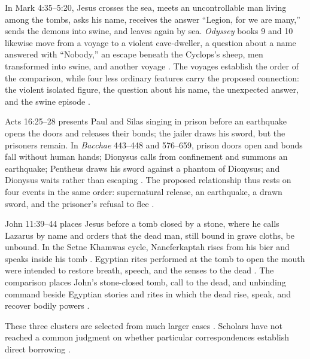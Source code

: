 In Mark 4:35--5:20, Jesus crosses the sea, meets an uncontrollable man living among the tombs, asks his name, receives the answer ``Legion, for we are many,'' sends the demons into swine, and leaves again by sea.
\emph{Odyssey} books 9 and 10 likewise move from a voyage to a violent cave-dweller, a question about a name answered with ``Nobody,'' an escape beneath the Cyclops's sheep, men transformed into swine, and another voyage \cite[9]{homer:odyssey}\cite[10]{homer:odyssey}\cite[63--74, 175--176]{macdonald:homeric-mark}.
The voyages establish the order of the comparison, while four less ordinary features carry the proposed connection: the violent isolated figure, the question about his name, the unexpected answer, and the swine episode \cite[63--74, 175--176]{macdonald:homeric-mark}.

Acts 16:25--28 presents Paul and Silas singing in prison before an earthquake opens the doors and releases their bonds; the jailer draws his sword, but the prisoners remain.
In \emph{Bacchae} 443--448 and 576--659, prison doors open and bonds fall without human hands; Dionysus calls from confinement and summons an earthquake; Pentheus draws his sword against a phantom of Dionysus; and Dionysus waits rather than escaping \cite[443--448]{euripides:bacchae}\cite[576--659]{euripides:bacchae}\cite{moles:jesus-dionysus}.
The proposed relationship thus rests on four events in the same order: supernatural release, an earthquake, a drawn sword, and the prisoner's refusal to flee \cite{moles:jesus-dionysus}.

John 11:39--44 places Jesus before a tomb closed by a stone, where he calls Lazarus by name and orders that the dead man, still bound in grave cloths, be unbound.
In the Setne Khamwas cycle, Naneferkaptah rises from his bier and speaks inside his tomb \cite[127--133]{lichtheim:ael3}.
Egyptian rites performed at the tomb to open the mouth were intended to restore breath, speech, and the senses to the dead \cite[310--329]{assmann:death-salvation}.
The comparison places John's stone-closed tomb, call to the dead, and unbinding command beside Egyptian stories and rites in which the dead rise, speak, and recover bodily powers \cite[127--133]{lichtheim:ael3}\cite[310--329]{assmann:death-salvation}.

These three clusters are selected from much larger cases \cite{macdonald:homeric-mark,macdonald:nt-homer,moles:jesus-dionysus}.
Scholars have not reached a common judgment on whether particular correspondences establish direct borrowing \cite{sandnes:imitatio-homeri}.

